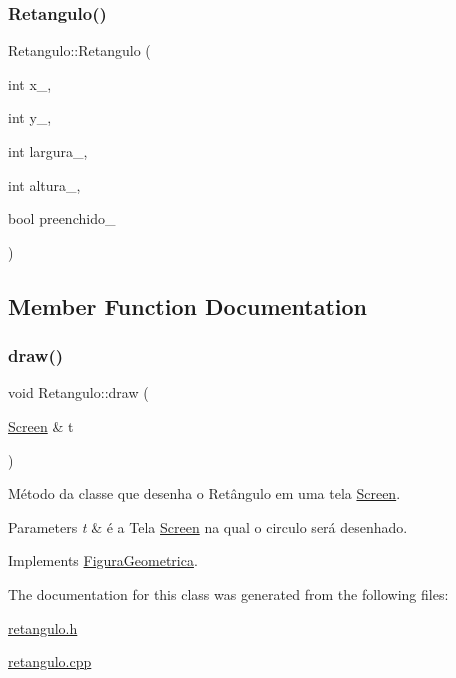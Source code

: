 \subsubsection{\texorpdfstring{Retangulo()}{Retangulo()}}
{\footnotesize\ttfamily Retangulo\+::\+Retangulo (\begin{DoxyParamCaption}\item[{int}]{x\+\_\+,  }\item[{int}]{y\+\_\+,  }\item[{int}]{largura\+\_\+,  }\item[{int}]{altura\+\_\+,  }\item[{bool}]{preenchido\+\_\+ }\end{DoxyParamCaption})}



\subsection{Member Function Documentation}
\mbox{\label{class_retangulo_ac088dd6d3f4f3d3f80363a868c2e74f1}} 
\subsubsection{\texorpdfstring{draw()}{draw()}}
{\footnotesize\ttfamily void Retangulo\+::draw (\begin{DoxyParamCaption}\item[{\hyperlink{class_screen}{Screen} \&}]{t }\end{DoxyParamCaption})\hspace{0.3cm}{\ttfamily [virtual]}}



Método da classe que desenha o Retângulo em uma tela \hyperlink{class_screen}{Screen}. 


\begin{DoxyParams}{Parameters}
{\em t} & é a Tela \hyperlink{class_screen}{Screen} na qual o circulo será desenhado. \\
\hline
\end{DoxyParams}


Implements \hyperlink{class_figura_geometrica_a8ee8dedc060b6059a805ea091aef2c41}{Figura\+Geometrica}.



The documentation for this class was generated from the following files\+:\begin{DoxyCompactItemize}
\item 
\hyperlink{retangulo_8h}{retangulo.\+h}\item 
\hyperlink{retangulo_8cpp}{retangulo.\+cpp}\end{DoxyCompactItemize}
